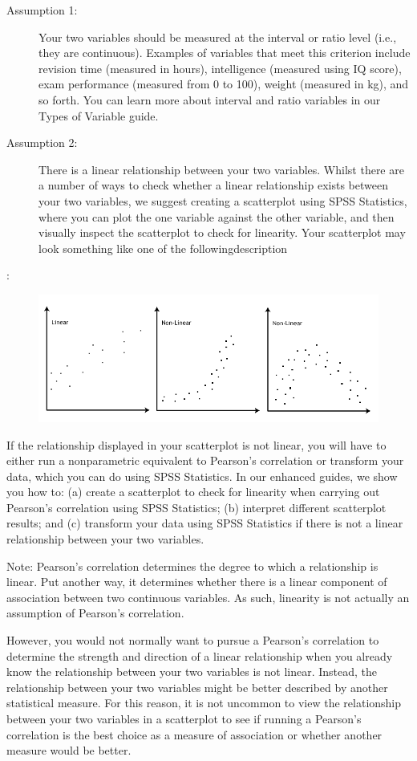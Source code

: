 \documentclass[]{article}
\begin{document}
\begin{description}
	\item[Assumption 1:]  Your two variables should be measured at the interval or ratio level (i.e., they are continuous). Examples of variables that meet this criterion include revision time (measured in hours), intelligence (measured using IQ score), exam performance (measured from 0 to 100), weight (measured in kg), and so forth. You can learn more about interval and ratio variables in our Types of Variable guide.
	
	\item[Assumption 2:] There is a linear relationship between your two variables. Whilst there are a number of ways to check whether a linear relationship exists between your two variables, we suggest creating a scatterplot using SPSS Statistics, where you can plot the one variable against the other variable, and then visually inspect the scatterplot to check for linearity. Your scatterplot may look something like one of the followingdescription
\end{description}
:
\begin{figure}
\centering
\includegraphics[width=0.7\linewidth]{images/linear-non-linear}
\end{figure}

If the relationship displayed in your scatterplot is not linear, you will have to either run a nonparametric equivalent to Pearson’s correlation or transform your data, which you can do using SPSS Statistics. In our enhanced guides, we show you how to: (a) create a scatterplot to check for linearity when carrying out Pearson’s correlation using SPSS Statistics; (b) interpret different scatterplot results; and (c) transform your data using SPSS Statistics if there is not a linear relationship between your two variables.

Note: Pearson's correlation determines the degree to which a relationship is linear. Put another way, it determines whether there is a linear component of association between two continuous variables. As such, linearity is not actually an assumption of Pearson's correlation. 

However, you would not normally want to pursue a Pearson's correlation to determine the strength and direction of a linear relationship when you already know the relationship between your two variables is not linear. Instead, the relationship between your two variables might be better described by another statistical measure. For this reason, it is not uncommon to view the relationship between your two variables in a scatterplot to see if running a Pearson's correlation is the best choice as a measure of association or whether another measure would be better.
\end{document}
